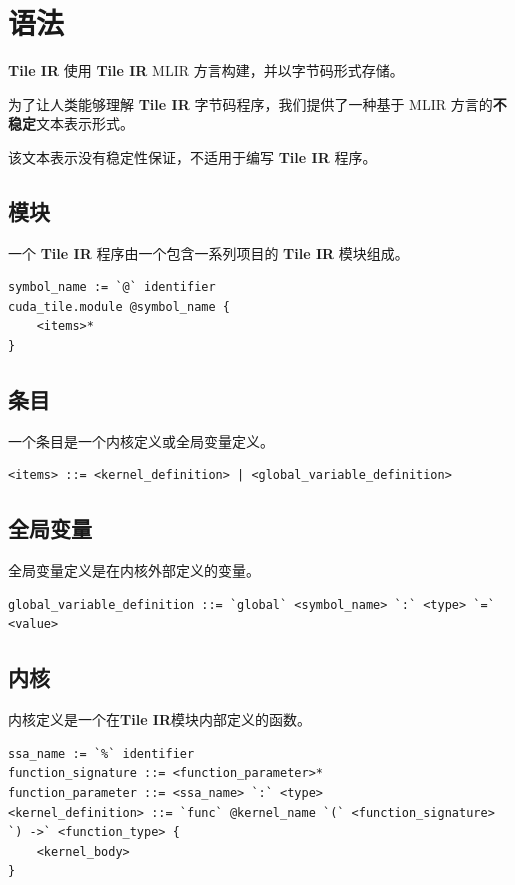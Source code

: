\documentclass{article}
\begin{document}
\newpage
\section{语法}

\textbf{Tile IR} 使用 \textbf{Tile IR} MLIR 方言构建，并以字节码形式存储。


为了让人类能够理解 \textbf{Tile IR} 字节码程序，我们提供了一种基于 MLIR 方言的\textbf{不稳定}文本表示形式。

该文本表示没有稳定性保证，不适用于编写 \textbf{Tile IR} 程序。


\subsection{模块}

一个 \textbf{Tile IR} 程序由一个包含一系列项目的 \textbf{Tile IR} 模块组成。


\begin{lstlisting}
symbol_name := `@` identifier
cuda_tile.module @symbol_name {
    <items>*
}
\end{lstlisting}


\subsection{条目}

一个条目是一个内核定义或全局变量定义。


\begin{lstlisting}
<items> ::= <kernel_definition> | <global_variable_definition>
\end{lstlisting}


\subsection{全局变量}

全局变量定义是在内核外部定义的变量。


\begin{lstlisting}
global_variable_definition ::= `global` <symbol_name> `:` <type> `=` <value>
\end{lstlisting}


\subsection{内核}

内核定义是一个在\textbf{Tile IR}模块内部定义的函数。


\begin{lstlisting}
ssa_name := `%` identifier
function_signature ::= <function_parameter>*
function_parameter ::= <ssa_name> `:` <type>
<kernel_definition> ::= `func` @kernel_name `(` <function_signature> `) ->` <function_type> {
    <kernel_body>
}
\end{lstlisting}
\end{document}
